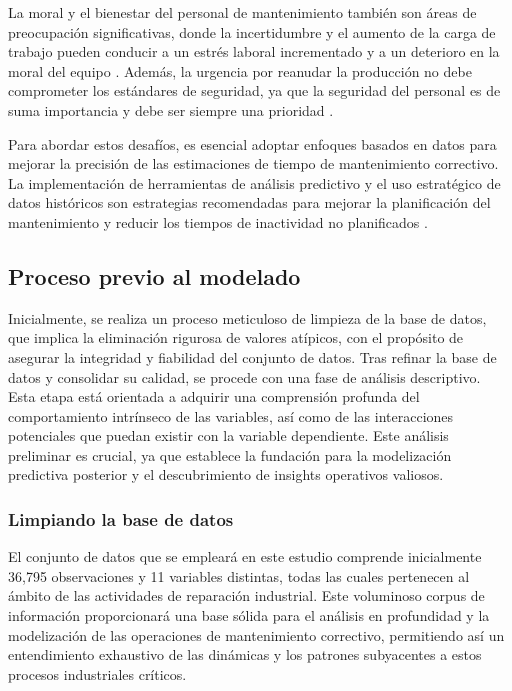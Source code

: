 \documentclass[
  11pt,
  bookmarksnumbered]{article}
\begin{document}
La moral y el bienestar del personal de mantenimiento también son áreas de preocupación significativas, donde la incertidumbre y el aumento de la carga de trabajo pueden conducir a un estrés laboral incrementado y a un deterioro en la moral del equipo \textcite{TaylorSchmidt2020}.
Además, la urgencia por reanudar la producción no debe comprometer los estándares de seguridad, ya que la seguridad del personal es de suma importancia y debe ser siempre una prioridad \textcite{GonzalezMartinez2022}.

Para abordar estos desafíos, es esencial adoptar enfoques basados en datos para mejorar la precisión de las estimaciones de tiempo de mantenimiento correctivo.
La implementación de herramientas de análisis predictivo y el uso estratégico de datos históricos son estrategias recomendadas para mejorar la planificación del mantenimiento y reducir los tiempos de inactividad no planificados \textcite{Morales2020}.

\hypertarget{proceso-previo-al-modelado}{%
\subsection{Proceso previo al modelado}\label{proceso-previo-al-modelado}}

Inicialmente, se realiza un proceso meticuloso de limpieza de la base de datos, que implica la eliminación rigurosa de valores atípicos, con el propósito de asegurar la integridad y fiabilidad del conjunto de datos.
Tras refinar la base de datos y consolidar su calidad, se procede con una fase de análisis descriptivo.
Esta etapa está orientada a adquirir una comprensión profunda del comportamiento intrínseco de las variables, así como de las interacciones potenciales que puedan existir con la variable dependiente.
Este análisis preliminar es crucial, ya que establece la fundación para la modelización predictiva posterior y el descubrimiento de insights operativos valiosos.

\hypertarget{limpiando-la-base-de-datos}{%
\subsubsection{Limpiando la base de datos}\label{limpiando-la-base-de-datos}}

El conjunto de datos que se empleará en este estudio comprende inicialmente 36,795 observaciones y 11 variables distintas, todas las cuales pertenecen al ámbito de las actividades de reparación industrial.
Este voluminoso corpus de información proporcionará una base sólida para el análisis en profundidad y la modelización de las operaciones de mantenimiento correctivo, permitiendo así un entendimiento exhaustivo de las dinámicas y los patrones subyacentes a estos procesos industriales críticos.
\end{document}
